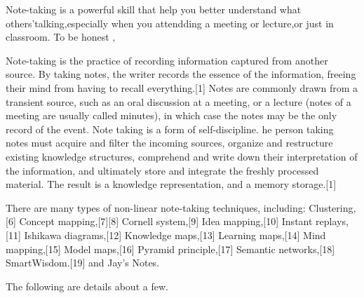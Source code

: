 \documentclass[a4paper, 11pt]{article}
\begin{document}
\begin{CJK}{UTF8}{gbsn}

\newtheorem{example}{例}             %
\newtheorem{algorithm}{算法}
\newtheorem{theorem}{定理}[section]  %
\newtheorem{definition}{定义}
\newtheorem{axiom}{公理}
\newtheorem{property}{性质}
\newtheorem{proposition}{命题}
\newtheorem{lemma}{引理}
\newtheorem{corollary}{推论}
\newtheorem{remark}{注解}
\newtheorem{condition}{条件}
\newtheorem{conclusion}{结论}
\newtheorem{assumption}{假设}

\renewcommand{\contentsname}{目录}  %
\renewcommand{\abstractname}{摘要}  %
\renewcommand{\refname}{参考文献}   %
\renewcommand{\indexname}{索引}
\renewcommand{\figurename}{图}
\renewcommand{\tablename}{表}
\renewcommand{\appendixname}{附录}
\renewcommand{\algorithm}{算法}







Note-taking is a powerful skill that help you better understand what others'talking,especially when you attendding a meeting or lecture,or just in classroom. To be honest , 

Note-taking is the practice of recording information captured from another source. By taking notes, the writer records the essence of the information, freeing their mind from having to recall everything.[1] Notes are commonly drawn from a transient source, such as an oral discussion at a meeting, or a lecture (notes of a meeting are usually called minutes), in which case the notes may be the only record of the event. Note taking is a form of self-discipline.
he person taking notes must acquire and filter the incoming sources, organize and restructure existing knowledge structures, comprehend and write down their interpretation of the information, and ultimately store and integrate the freshly processed material. The result is a knowledge representation, and a memory storage.[1]

There are many types of non-linear note-taking techniques, including: Clustering,[6] Concept mapping,[7][8] Cornell system,[9] Idea mapping,[10] Instant replays,[11] Ishikawa diagrams,[12] Knowledge maps,[13] Learning maps,[14] Mind mapping,[15] Model maps,[16] Pyramid principle,[17] Semantic networks,[18] SmartWisdom.[19] and Jay's Notes.

The following are details about a few.


\end{CJK}
\end{document}
